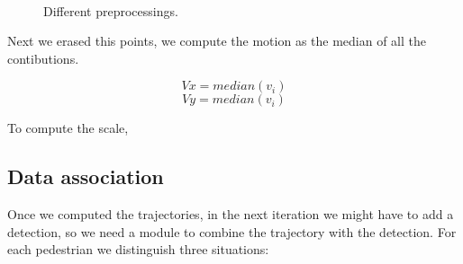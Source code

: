 \documentclass[12pt, a4paper, titlepage,twoside,openright]{article}
\begin{document}
\begin{figure}[H]
		
\centering

\\
\caption{Different preprocessings.}
\label{motion2}
\end{figure}


Next we erased this points, we compute the motion as the median of all the contibutions.

$$ Vx = median(v_{i})$$
$$ Vy = median(v_{i})$$


To compute the scale, 





\subsection{Data association}


Once we computed the trajectories, in the next iteration we might have to add a detection, so we need a module to combine the trajectory with the detection. For each pedestrian we distinguish three situations:
\end{document}
